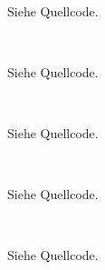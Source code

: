 \documentclass[a4paper]{scrartcl}
\begin{document}
\begin{aufgabe}~

	Siehe Quellcode.
\end{aufgabe}

\begin{aufgabe}~

	Siehe Quellcode.
\end{aufgabe}

\begin{aufgabe}~

	Siehe Quellcode.
\end{aufgabe}

\begin{aufgabe}~

	Siehe Quellcode.
\end{aufgabe}

\begin{aufgabe}~

	Siehe Quellcode.
\end{aufgabe}
\end{document}

